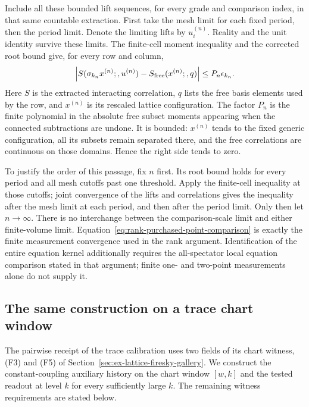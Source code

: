Include all these bounded lift sequences, for every grade and comparison
index, in that same countable extraction. First take the mesh limit for
each fixed period, then the period limit. Denote the limiting lifts by
$u_i^{(n)}$. Reality and the unit identity survive these limits. The
finite-cell moment inequality and the corrected root bound give, for
every row and column,
\begin{equation}\label{eq:rank-purchased-point-comparison}
 \left|S(\sigma_{k_n}x^{(n)};,u^{(n)})
                 -S_{\rm free}(x^{(n)};,q)\right|
             \le P_n\epsilon_{k_n}.
\end{equation}
Here $S$ is the extracted interacting correlation, $q$ lists the free
basis elements used by the row, and $x^{(n)}$ is its rescaled lattice
configuration. The factor $P_n$ is the finite polynomial in the absolute
free subset moments appearing when the connected subtractions are
undone. It is bounded: $x^{(n)}$ tends to the fixed generic configuration,
all its subsets remain separated there, and the free correlations are
continuous on those domains. Hence the right side tends to zero.

To justify the order of this passage, fix $n$ first. Its root bound holds
for every period and all mesh cutoffs past one threshold. Apply the
finite-cell inequality at those cutoffs; joint convergence of the lifts
and correlations gives the inequality after the mesh limit at each
period, and then after the period limit. Only then let $n\to\infty$.
There is no interchange between the comparison-scale limit and either
finite-volume limit. Equation~\eqref{eq:rank-purchased-point-comparison}
is exactly the finite measurement convergence used in the rank argument.
Identification of the entire equation kernel additionally requires the
all-spectator local equation comparison stated in that argument; finite
one- and two-point measurements alone do not supply it.

\subsection{The same construction on a trace chart window}
\label{subsec:rank-trace-chart-window}

The pairwise receipt of the trace calibration uses two fields of its
chart witness, (F3) and (F5) of Section~\ref{sec:ex-lattice-firesky-gallery}.
We construct the constant-coupling auxiliary history on the chart window
$[w,k]$ and the tested readout at level $k$ for every sufficiently large
$k$. The remaining witness requirements are stated below.

